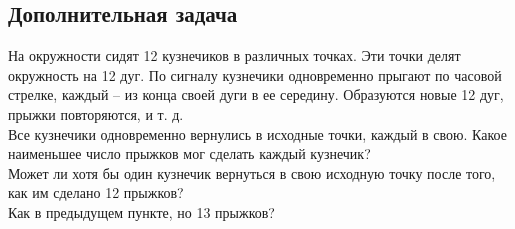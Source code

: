 

\subsection*{Дополнительная задача}



\begin{problems}

\item
На окружности сидят 12 кузнечиков в различных точках. Эти точки делят окружность на 12 дуг. По сигналу кузнечики одновременно прыгают по часовой стрелке, каждый – из конца своей дуги в ее середину. Образуются новые 12 дуг, прыжки повторяются, и т. д. 
\\
\sp
Все кузнечики одновременно вернулись в исходные точки, каждый в свою. Какое наименьшее число прыжков мог сделать каждый кузнечик?
\\
\sp
Может ли хотя бы один кузнечик вернуться в свою исходную точку после того, как им сделано 12 прыжков?
\\
\sp
Как в предыдущем пункте, но 13 прыжков?

\end{problems}

